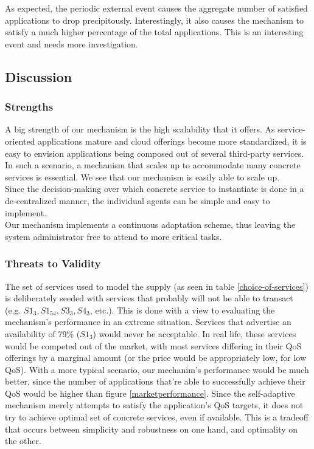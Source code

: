\documentclass[10pt,journal,compsoc]{IEEEtran}
\begin{document}
As expected, the periodic external event causes the aggregate number of satisfied applications to drop precipitously. Interestingly, it also causes the mechanism to satisfy a much higher percentage of the total applications. This is an interesting event and needs more investigation.

\subsection{Discussion}
\subsubsection{Strengths}
A big strength of our mechanism is the high scalability that it offers. As service-oriented applications mature and cloud offerings become more standardized, it is easy to envision applications being composed out of several third-party services. In such a scenario, a mechanism that scales up to accommodate many concrete services is essential. We see that our mechanism is easily able to scale up.\\
Since the decision-making over which concrete service to instantiate is done in a de-centralized manner, the individual agents can be simple and easy to implement. \\    
Our mechanism implements a continuous adaptation scheme, thus leaving the system administrator free to attend to more critical tasks.

\subsubsection{Threats to Validity}

The set of services used to model the supply (as seen in table \ref{choice-of-services}) is deliberately seeded with services that probably will not be able to transact (e.g. $S1_{3}, S1_{54}, S3_{3}, S4_{3}$, etc.). This is done with a view to evaluating the mechanism's performance in an extreme situation. Services that advertise an availability of 79\% ($S1_{3}$) would never be acceptable.  In real life, these services would be competed out of the market, with most services differing in their QoS offerings by a marginal amount (or the price would be appropriately low, for low QoS). With a more typical scenario, our mechanim's performance would be much better, since the number of applications that're able to successfully achieve their QoS would be higher than figure \ref{marketperformance}. Since the self-adaptive mechanism merely attempts to satisfy the application's QoS targets, it does not try to achieve  optimal set of concrete services, even if available. This is a tradeoff that occurs between simplicity and robustness on one hand, and optimality on the other.\\
\end{document}
